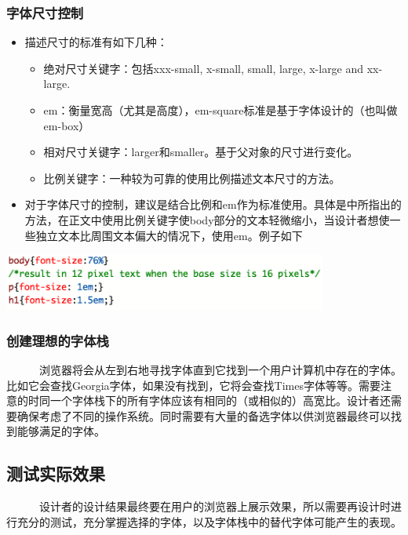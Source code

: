 \documentclass[a4paper]{article}
\begin{document}
\subsubsection{字体尺寸控制}
		\begin{itemize}
			\item 描述尺寸的标准有如下几种：
			\begin{itemize}
			\item 绝对尺寸关键字：包括xxx-small, x-small, small, large, x-large and xx-large.
			\item em：衡量宽高（尤其是高度），em-square标准是基于字体设计的（也叫做
		em-box）
			\item 相对尺寸关键字：larger和smaller。基于父对象的尺寸进行变化。
			\item 比例关键字：一种较为可靠的使用比例描述文本尺寸的方法。
			\end{itemize}
			\item 对于字体尺寸的控制，建议是结合比例和em作为标准使用。具体是\cite{nutshell}中所指出的方法，在正文中使用比例关键字使body部分的文本轻微缩小，当设计者想使一些独立文本比周围文本偏大的情况下，使用em。例子如下
		\end{itemize}
			
\makeatletter
\def\@captype{figure}
\makeatother
\centerline{\includegraphics [width=0.8\textwidth]{Jing_fig9.png} }
\label{jing9}

\subsubsection{创建理想的字体栈}

~~~~~~浏览器将会从左到右地寻找字体直到它找到一个用户计算机中存在的字体。比如它会查找Georgia字体，如果没有找到，它将会查找Times字体等等。需要注意的时同一个字体栈下的所有字体应该有相同的（或相似的）高宽比。设计者还需要确保考虑了不同的操作系统。同时需要有大量的备选字体以供浏览器最终可以找到能够满足的字体。
	


\subsection{测试实际效果}

~~~~~~设计者的设计结果最终要在用户的浏览器上展示效果，所以需要再设计时进行充分的测试，充分掌握选择的字体，以及字体栈中的替代字体可能产生的表现。



\end{document}
